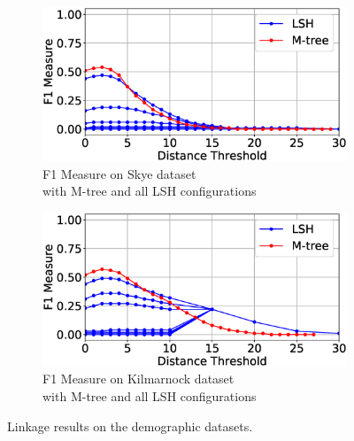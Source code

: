 \documentclass{llncs}
\begin{document}
\begin{figure}[t]
\begin{subfigure}{.5\textwidth}
  \centering
\includegraphics[width=\textwidth]{figures/plotFs-skye-f}
\vspace{-6mm}
\caption{F1 Measure on Skye dataset \\ with M-tree and all LSH configurations}
\end{subfigure}%
\begin{subfigure}{.5\textwidth}
  \centering
\includegraphics[width=\textwidth]{figures/plotFs-kilmarnock-f}
\vspace{-6mm}
\caption{F1 Measure on Kilmarnock dataset \\ with M-tree and all LSH configurations}
\end{subfigure}
\caption{Linkage results on the demographic datasets.}
\label{demography-quality}
\end{figure}

\end{document}

